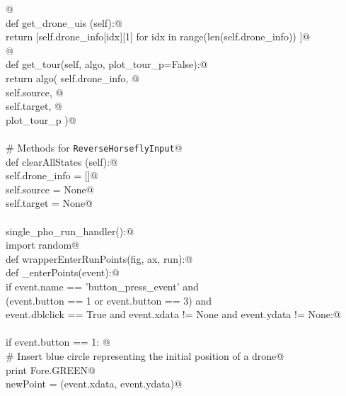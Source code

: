\documentclass[10pt, english, oneside]{report}
\begin{document}
\begin{appendices}
\begin{flushleft}
\begin{list}{}{}
\mbox{}\verb@           @\\
\mbox{}\verb@    def get_drone_uis (self):@\\
\mbox{}\verb@           return [self.drone_info[idx][1] for idx in range(len(self.drone_info)) ]@\\
\mbox{}\verb@         @\\
\mbox{}\verb@    def get_tour(self, algo, plot_tour_p=False):@\\
\mbox{}\verb@           return algo( self.drone_info, @\\
\mbox{}\verb@                        self.source, @\\
\mbox{}\verb@                        self.target, @\\
\mbox{}\verb@                        plot_tour_p    )@\\
\mbox{}\verb@@\\
\mbox{}\verb@    # Methods for \verb|ReverseHorseflyInput|@\\
\mbox{}\verb@    def clearAllStates (self):@\\
\mbox{}\verb@          self.drone_info = []@\\
\mbox{}\verb@          self.source = None@\\
\mbox{}\verb@          self.target = None@\\
\mbox{}\verb@@\\
\mbox{}\verb@def single_pho_run_handler():@\\
\mbox{}\verb@    import random@\\
\mbox{}\verb@    def wrapperEnterRunPoints(fig, ax, run):@\\
\mbox{}\verb@      def _enterPoints(event):@\\
\mbox{}\verb@        if event.name      == 'button_press_event'          and \@\\
\mbox{}\verb@           (event.button   == 1 or event.button == 3)       and \@\\
\mbox{}\verb@            event.dblclick == True and event.xdata  != None and event.ydata  != None:@\\
\mbox{}\verb@@\\
\mbox{}\verb@             if event.button == 1:  @\\
\mbox{}\verb@                 # Insert blue circle representing the initial position of a drone@\\
\mbox{}\verb@                 print Fore.GREEN@\\
\mbox{}\verb@                 newPoint = (event.xdata, event.ydata)@\\

\end{list}
\end{flushleft}
\end{appendices}
\end{document}
